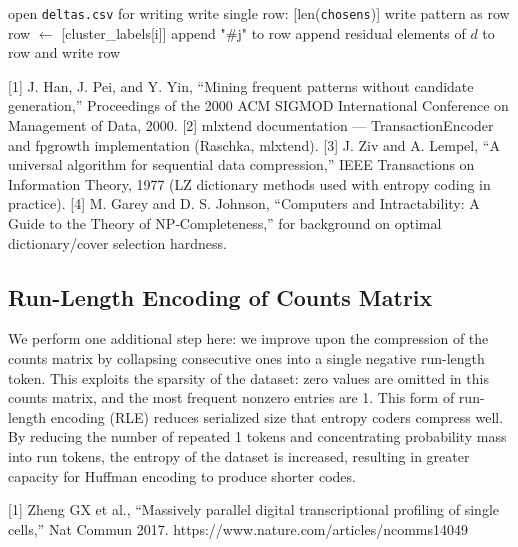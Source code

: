 \documentclass[unnumsec,webpdf,contemporary,large]{oup-authoring-template}
\begin{document}
\begin{algorithmic}[1]
  \State open \texttt{deltas.csv} for writing
  \State write single row: [len(\texttt{chosens})]
   \State write pattern as row
  \EndFor
    \State row $\leftarrow$ [cluster\_labels[i]]
       append "\#j" to row
      \EndIf
    \EndFor
    \State append residual elements of $d$ to row and write row
  \EndFor
\EndFunction
\end{algorithmic}

[1] J. Han, J. Pei, and Y. Yin, “Mining frequent patterns without candidate generation,” Proceedings of the 2000 ACM SIGMOD International Conference on Management of Data, 2000.
[2] mlxtend documentation — TransactionEncoder and fpgrowth implementation (Raschka, mlxtend).
[3] J. Ziv and A. Lempel, “A universal algorithm for sequential data compression,” IEEE Transactions on Information Theory, 1977 (LZ dictionary methods used with entropy coding in practice).
[4] M. Garey and D. S. Johnson, “Computers and Intractability: A Guide to the Theory of NP‑Completeness,” for background on optimal dictionary/cover selection hardness.

\subsection{Run-Length Encoding of Counts Matrix}
We perform one additional step here: we improve upon the compression of the counts matrix by collapsing consecutive ones into a single negative run-length token. This exploits the sparsity of the dataset: zero values are omitted in this counts matrix, and the most frequent nonzero entries are 1. This form of run-length encoding (RLE) reduces serialized size that entropy coders compress well. By reducing the number of repeated 1 tokens and concentrating probability mass into run tokens, the entropy of the dataset is increased, resulting in greater capacity for Huffman encoding to produce shorter codes. 

[1] Zheng GX et al., “Massively parallel digital transcriptional profiling of single cells,” Nat Commun 2017. https://www.nature.com/articles/ncomms14049 
\end{document}
